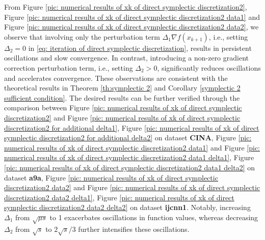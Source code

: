 \documentclass[11pt]{article}
\newcommand{\1}{\mathbf 1}
\numberwithin{equation}{section}
\begin{document}
From Figure \ref{pic: numerical results of xk of direct symplectic discretization2}, Figure \ref{pic: numerical results of xk of direct symplectic discretization2 data1} and Figure \ref{pic: numerical results of xk of direct symplectic discretization2 data2}, we observe that involving only the perturbation term $\Delta_1 \nabla f(x_{k+1})$, i.e., setting $\Delta_2 =0$ in \eqref{eq: iteration of direct symplectic discretization}, results in persistent oscillations and slow convergence. In contrast, introducing a non-zero gradient correction perturbation term, i.e., setting $\Delta_2 >0$, significantly reduces oscillations and accelerates convergence. 
These observations are consistent with the theoretical results in Theorem \ref{th:symplectic 2} and Corollary \ref{symplectic 2 sufficient condition}.
The desired results can be further verified 
through the comparison between Figure \ref{pic: numerical results of xk of direct symplectic discretization2}
and Figure \ref{pic: numerical results of xk of direct symplectic discretization2 for additional delta1}, Figure \ref{pic: numerical results of xk of direct symplectic discretization2 for additional delta2} on dataset {\bf CINA}, Figure \ref{pic: numerical results of xk of direct symplectic discretization2 data1} and Figure \ref{pic: numerical results of xk of direct symplectic discretization2 data1 delta1}, Figure \ref{pic: numerical results of xk of direct symplectic discretization2 data1 delta2} on dataset {\bf a9a}, Figure \ref{pic: numerical results of xk of direct symplectic discretization2 data2} and Figure \ref{pic: numerical results of xk of direct symplectic discretization2 data2 delta1}, Figure \ref{pic: numerical results of xk of direct symplectic discretization2 data2 delta2} on dataset {\bf ijcnn1}. Notably, increasing $\Delta_1$ from $\sqrt{\mu s}$ to 1 exacerbates oscillations in function values, whereas decreasing $\Delta_2$ from $\sqrt{s}$ to $2\sqrt{s}/3$ further intensifies these oscillations.
\end{document}
